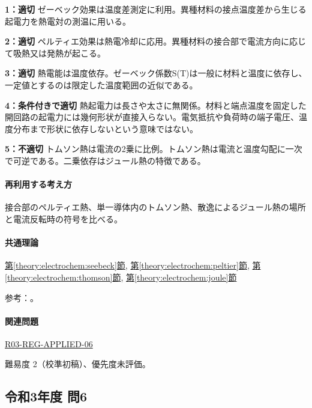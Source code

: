 \noindent\textbf{1：適切} ゼーベック効果は温度差測定に利用。異種材料の接点温度差から生じる起電力を熱電対の測温に用いる。\par

\noindent\textbf{2：適切} ペルティエ効果は熱電冷却に応用。異種材料の接合部で電流方向に応じて吸熱又は発熱が起こる。\par

\noindent\textbf{3：適切} 熱電能は温度依存。ゼーベック係数S(T)は一般に材料と温度に依存し、一定値とするのは限定した温度範囲の近似である。\par

\noindent\textbf{4：条件付きで適切} 熱起電力は長さや太さに無関係。材料と端点温度を固定した開回路の起電力には幾何形状が直接入らない。電気抵抗や負荷時の端子電圧、温度分布まで形状に依存しないという意味ではない。\par

\noindent\textbf{5：不適切} トムソン熱は電流の2乗に比例。トムソン熱は電流と温度勾配に一次で可逆である。二乗依存はジュール熱の特徴である。\par

\paragraph{再利用する考え方} 接合部のペルティエ熱、単一導体内のトムソン熱、散逸によるジュール熱の場所と電流反転時の符号を比べる。

\paragraph{共通理論} \hyperref[theory:electrochem:seebeck]{第\ref*{theory:electrochem:seebeck}節}, \hyperref[theory:electrochem:peltier]{第\ref*{theory:electrochem:peltier}節}, \hyperref[theory:electrochem:thomson]{第\ref*{theory:electrochem:thomson}節}, \hyperref[theory:electrochem:joule]{第\ref*{theory:electrochem:joule}節}

\par 参考：\cite{mit_thermoelectric2024}。

\paragraph{関連問題} \hyperref[q:r03-reg-applied-06]{R03-REG-APPLIED-06}

\par 難易度 2（校準初稿）、優先度未評価。

\subsection{令和3年度 問6}
\label{q:r03-reg-applied-06}

